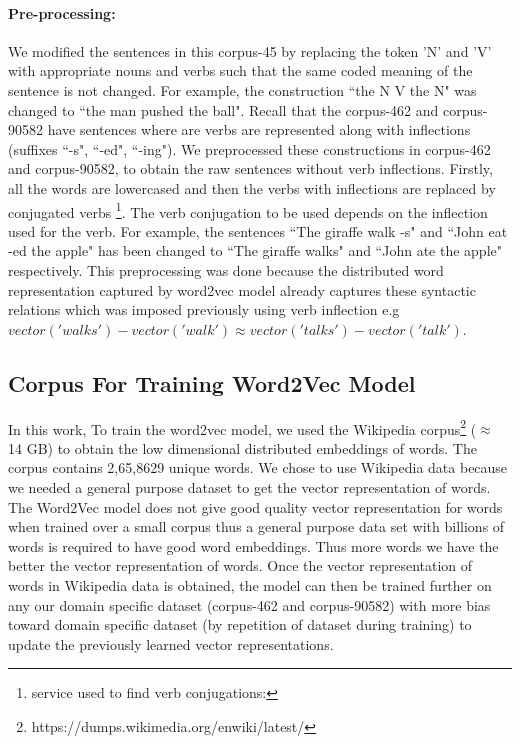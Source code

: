 \paragraph{Pre-processing:} We modified the sentences in this corpus-45 by replacing the token 'N' and 'V' with appropriate nouns and verbs such that the same coded meaning of the sentence is not changed. For example, the construction ``the N V the N" was changed to ``the man pushed the ball". Recall that the corpus-462 and corpus-90582 have sentences where are verbs are represented along with inflections (suffixes ``-s", ``-ed", ``-ing"). We preprocessed these constructions in corpus-462 and corpus-90582, to obtain the raw sentences without verb inflections. Firstly, all the words are lowercased and then the verbs with inflections are replaced by conjugated verbs \footnote{service used to find verb conjugations: }. The verb conjugation to be used depends on the inflection used for the verb. For example, the sentences ``The giraffe walk -s" and ``John eat -ed the apple" has been changed to ``The giraffe walks" and ``John ate the apple" respectively. This preprocessing was done because the distributed word representation captured by word2vec model already captures these syntactic relations which was imposed previously using verb inflection e.g $vector('walks') - vector('walk') \approx vector('talks') - vector('talk')$. 
  
\subsection{Corpus For Training Word2Vec Model}

In this work, To train the word2vec model, we used the Wikipedia corpus\footnote{https://dumps.wikimedia.org/enwiki/latest/} ($\approx$ 14 GB) to obtain the low dimensional distributed embeddings of words. The corpus contains 2,65,8629 unique words. We chose to use Wikipedia data because we needed a general purpose dataset to get the vector representation of words. The Word2Vec model does not give good quality vector representation for words when trained over a small corpus thus a general purpose data set with billions of words is required to have good word embeddings. Thus more words we have the better the vector representation of words. Once the vector representation of words in Wikipedia data is obtained, the model can then be trained further on any our domain specific dataset (corpus-462 and corpus-90582) with more bias toward domain specific dataset (by repetition of dataset during training) to update the previously learned vector representations. 

